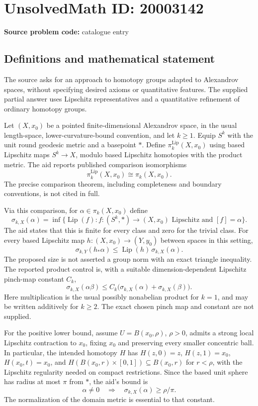 \documentclass[11pt]{article}
\begin{document}
\section*{UnsolvedMath ID: 20003142}
\textbf{Source problem code:} catalogue entry
\subsection{Definitions and mathematical statement}
The source asks for an approach to homotopy groups adapted to Alexandrov spaces, without specifying desired axioms or quantitative features. The supplied partial answer uses Lipschitz representatives and a quantitative refinement of ordinary homotopy groups.

Let \((X,x_0)\) be a pointed finite-dimensional Alexandrov space, in the usual length-space, lower-curvature-bound convention, and let \(k\geq1\). Equip \(S^k\) with the unit round geodesic metric and a basepoint \(*\). Define \(\pi_k^{\mathrm{Lip}}(X,x_0)\) using based Lipschitz maps \(S^k\to X\), modulo based Lipschitz homotopies with the product metric. The aid reports published comparison isomorphisms
\[
 \pi_k^{\mathrm{Lip}}(X,x_0)\cong\pi_k(X,x_0).
\]
The precise comparison theorem, including completeness and boundary conventions, is not cited in full.

Via this comparison, for \(\alpha\in\pi_k(X,x_0)\) define
\[
 \sigma_{k,X}(\alpha)=\inf\{\operatorname{Lip}(f):f:(S^k,*)\to(X,x_0)
 \text{ Lipschitz and }[f]=\alpha\}.
\]
The aid states that this is finite for every class and zero for the trivial class. For every based Lipschitz map \(h:(X,x_0)\to(Y,y_0)\) between spaces in this setting,
\[
 \sigma_{k,Y}(h_*\alpha)\leq\operatorname{Lip}(h)\,\sigma_{k,X}(\alpha).
\]
The proposed size is not asserted a group norm with an exact triangle inequality. The reported product control is, with a suitable dimension-dependent Lipschitz pinch-map constant \(C_k\),
\[
 \sigma_{k,X}(\alpha\beta)\leq C_k\bigl(\sigma_{k,X}(\alpha)+\sigma_{k,X}(\beta)\bigr).
\]
Here multiplication is the usual possibly nonabelian product for \(k=1\), and may be written additively for \(k\geq2\). The exact chosen pinch map and constant are not supplied.

For the positive lower bound, assume \(U=B(x_0,\rho)\), \(\rho>0\), admits a strong local Lipschitz contraction to \(x_0\), fixing \(x_0\) and preserving every smaller concentric ball. In particular, the intended homotopy \(H\) has \(H(z,0)=z\), \(H(z,1)=x_0\), \(H(x_0,t)=x_0\), and \(H(B(x_0,r)\times[0,1])\subseteq B(x_0,r)\) for \(r<\rho\), with the Lipschitz regularity needed on compact restrictions. Since the based unit sphere has radius at most \(\pi\) from \(*\), the aid's bound is
\[
 \alpha\ne0\quad\Longrightarrow\quad\sigma_{k,X}(\alpha)\geq\rho/\pi.
\]
The normalization of the domain metric is essential to that constant.
\end{document}
